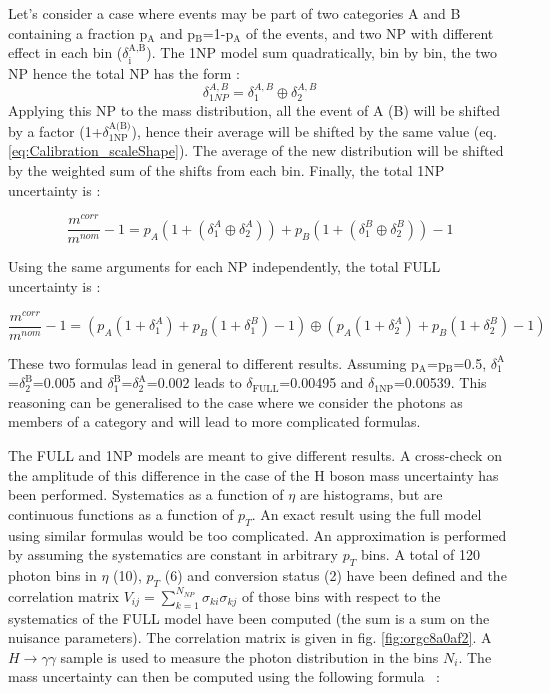 \begin{enumerate}
\begin{enumerate}
Let's consider a case where events may be part of two categories A and B containing a fraction p\(_{\text{A}}\) and p\(_{\text{B}}\)=1-p\(_{\text{A}}\) of the events, and two NP with different effect in each bin (\(\delta_{\text{i}}^{\text{A,B}}\)).
The 1NP model sum quadratically, bin by bin, the two NP hence the total NP has the form :
\begin{equation}
\delta_{1NP}^{A,B} = \delta_1^{A,B} \oplus \delta_2^{A,B}
\end{equation}
Applying this NP to the mass distribution, all the event of A (B) will be shifted by a factor (1+\(\delta_{\text{1NP}}^{\text{A(B)}}\)), hence their average will be shifted by the same value (eq. \ref{eq:Calibration_scaleShape}).
The average of the new distribution will be shifted by the weighted sum of the shifts from each bin.
Finally, the total 1NP uncertainty is :

\begin{equation}
    \frac{m^{corr}}{m^{nom}} -1 = p_A(1+(\delta_{1}^A\oplus \delta_{2}^A )) + p_B(1+(\delta_{1}^B\oplus \delta_{2}^B)) -1
\end{equation}

Using the same arguments for each NP independently, the total FULL uncertainty is :

\begin{equation}
  \frac{m^{corr}}{m^{nom}} -1 =\left(p_A(1+\delta_{1}^A) + p_B(1+\delta_{1}^B) -1 \right) \oplus \left( p_A(1+\delta_{2}^A) + p_B(1+\delta_{2}^B) -1 \right)
\end{equation}

These two formulas lead in general to different results.
Assuming p\(_{\text{A}}\)=p\(_{\text{B}}\)=0.5, \(\delta_{\text{1}}^{\text{A}}\)=\(\delta_{\text{2}}^{\text{B}}\)=0.005 and \(\delta_{\text{1}}^{\text{B}}\)=\(\delta_{\text{2}}^{\text{A}}\)=0.002 leads to \(\delta_{\text{FULL}}\)=0.00495 and \(\delta_{\text{1NP}}\)=0.00539.
This reasoning can be generalised to the case where we consider the photons as members of a category and will lead to more complicated formulas.

The FULL and 1NP models are meant to give different results.
A cross-check on the amplitude of this difference in the case of the H boson mass uncertainty has been performed.
Systematics as a function of $\eta$ are histograms, but are continuous functions as a function of $p_T$.
An exact result using the full model using similar formulas would be too complicated.
An approximation is performed by assuming the systematics are constant in arbitrary $p_T$ bins.
A total of 120 photon bins in $\eta$ (10), $p_T$ (6) and conversion status (2) have been defined and the correlation matrix $V_{ij} = \sum_{k=1}^{N_{NP}} \sigma_{ki}\sigma_{kj}$ of those bins with respect to the systematics of the FULL model have been computed (the sum is a sum on the nuisance parameters).
The correlation matrix  is given in fig. \ref{fig:orgc8a0af2}.
A $H\rightarrow\gamma\gamma$ sample is used to measure the photon distribution in the bins \(N_i\).
The mass uncertainty can then be computed using the following formula \cite{170125_Goudet}~:


\end{enumerate}
\end{enumerate}
